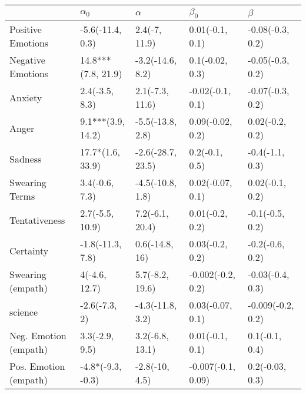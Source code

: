 \begin{tabular}{lllll}
\toprule
{} &          $\alpha_0$ &           $\alpha$ &           $\beta_0$ &            $\beta$ \\
\midrule
Positive Emotions     &    -5.6(-11.4, 0.3) &      2.4(-7, 11.9) &     0.01(-0.1, 0.1) &   -0.08(-0.3, 0.2) \\
Negative Emotions     &  14.8***(7.8, 21.9) &   -3.2(-14.6, 8.2) &     0.1(-0.02, 0.3) &   -0.05(-0.3, 0.2) \\
Anxiety               &      2.4(-3.5, 8.3) &    2.1(-7.3, 11.6) &    -0.02(-0.1, 0.1) &   -0.07(-0.3, 0.2) \\
Anger                 &   9.1***(3.9, 14.2) &   -5.5(-13.8, 2.8) &    0.09(-0.02, 0.2) &    0.02(-0.2, 0.2) \\
Sadness               &    17.7*(1.6, 33.9) &  -2.6(-28.7, 23.5) &      0.2(-0.1, 0.5) &    -0.4(-1.1, 0.3) \\
Swearing Terms        &      3.4(-0.6, 7.3) &   -4.5(-10.8, 1.8) &    0.02(-0.07, 0.1) &    0.02(-0.1, 0.2) \\
Tentativeness         &     2.7(-5.5, 10.9) &    7.2(-6.1, 20.4) &     0.01(-0.2, 0.2) &    -0.1(-0.5, 0.2) \\
Certainty             &    -1.8(-11.3, 7.8) &     0.6(-14.8, 16) &     0.03(-0.2, 0.2) &    -0.2(-0.6, 0.2) \\
Swearing (empath)     &       4(-4.6, 12.7) &    5.7(-8.2, 19.6) &   -0.002(-0.2, 0.2) &   -0.03(-0.4, 0.3) \\
science               &       -2.6(-7.3, 2) &   -4.3(-11.8, 3.2) &    0.03(-0.07, 0.1) &  -0.009(-0.2, 0.2) \\
Neg. Emotion (empath) &      3.3(-2.9, 9.5) &    3.2(-6.8, 13.1) &     0.01(-0.1, 0.1) &     0.1(-0.1, 0.4) \\
Pos. Emotion (empath) &   -4.8*(-9.3, -0.3) &     -2.8(-10, 4.5) &  -0.007(-0.1, 0.09) &    0.2(-0.03, 0.3) \\
\bottomrule
\end{tabular}

